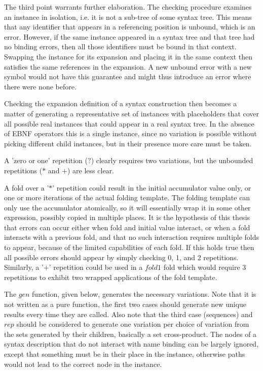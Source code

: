 \documentclass{kththesis}
\begin{document}
The third point warrants further elaboration. The checking procedure examines an instance in isolation, i.e. it is not a sub-tree of some syntax tree. This means that any identifier that appears in a referencing position is unbound, which is an error. However, if the same instance appeared in a syntax tree and that tree had no binding errors, then all those identifiers must be bound in that context. Swapping the instance for its expansion and placing it in the same context then satisfies the same references in the expansion. A new unbound error with a new symbol would not have this guarantee and might thus introduce an error where there were none before.

Checking the expansion definition of a syntax construction then becomes a matter of generating a representative set of instances with placeholders that cover all possible real instances that could appear in a real syntax tree. In the absence of EBNF operators this is a single instance, since no variation is possible without picking different child instances, but in their presence more care must be taken.

A 'zero or one' repetition ($?$) clearly requires two variations, but the unbounded repetitions ($*$ and $+$) are less clear.

A fold over a '$*$' repetition could result in the initial accumulator value only, or one or more iterations of the actual folding template. The folding template can only use the accumulator atomically, so it will essentially wrap it in some other expression, possibly copied in multiple places. It is the hypothesis of this thesis that errors can occur either when fold and initial value interact, or when a fold interacts with a previous fold, and that no such interaction requires multiple folds to appear, because of the limited capabilities of each fold. If this holds true then all possible errors should appear by simply checking 0, 1, and 2 repetitions. Similarly, a '$+$' repetition could be used in a $\mathit{fold1}$ fold which would require 3 repetitions to exhibit two wrapped applications of the fold template.

The $gen$ function, given below, generates the necessary variations. Note that it is not written as a pure function, the first two cases should generate new unique results every time they are called. Also note that the third case (sequences) and $rep$ should be considered to generate one variation per choice of variation from the sets generated by their children, basically a set cross-product. The nodes of a syntax description that do not interact with name binding can be largely ignored, except that something must be in their place in the instance, otherwise paths would not lead to the correct node in the instance.
\end{document}
